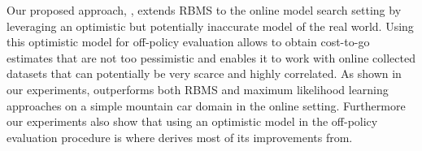 Our proposed approach, \taml{}, extends RBMS to the online model
search setting by leveraging an optimistic but potentially inaccurate
model of the real world. Using this optimistic model for off-policy
evaluation allows \taml{} to obtain cost-to-go estimates that are not
too pessimistic and enables it to work with online collected datasets
that can potentially be very scarce and highly correlated. As shown in
our experiments, \taml{} outperforms both RBMS and maximum likelihood
learning approaches on a simple mountain car domain in the online
setting. Furthermore our experiments also show that using an
optimistic model in the off-policy evaluation procedure is where
\taml{} derives most of its improvements from.

  
